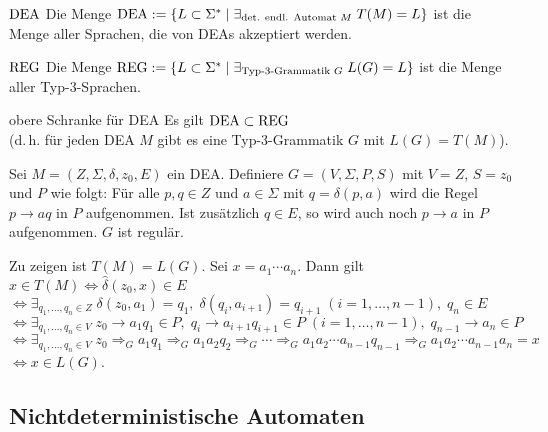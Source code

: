 \linie
\pagebreak

\begin{Def}{$\text{DEA}$}
    Die Menge $\text{DEA} := \{L \subset \Sigma^\ast \;|\;
    \exists_{\text{det. endl. Automat } M}\; T(M) = L\}$
    ist die Menge aller Sprachen, die von DEAs akzeptiert werden.
\end{Def}

\begin{Def}{$\text{REG}$}
    Die Menge $\text{REG} := \{L \subset \Sigma^\ast \;|\;
    \exists_{\text{Typ-3-Grammatik } G}\; L(G) = L\}$
    ist die Menge aller Typ-3-Sprachen.
\end{Def}

\begin{Satz}{obere Schranke für DEA}
    Es gilt $\text{DEA} \subset \text{REG}$\\
    (d.\,h. für jeden DEA $M$ gibt es eine Typ-3-Grammatik
    $G$ mit $L(G) = T(M)$).
\end{Satz}

\begin{Beweis}
    Sei $M = (Z, \Sigma, \delta, z_0, E)$ ein DEA.
    Definiere $G = (V, \Sigma, P, S)$ mit $V = Z$, $S = z_0$ und $P$ wie folgt:
    Für alle $p, q \in Z$ und $a \in \Sigma$ mit $q = \delta(p, a)$ wird
    die Regel $p \rightarrow aq$ in $P$ aufgenommen.
    Ist zusätzlich $q \in E$, so wird auch noch $p \rightarrow a$ in $P$
    aufgenommen.
    $G$ ist regulär.
    
    Zu zeigen ist $T(M) = L(G)$.
    Sei $x = a_1 \dotsb a_n$. Dann gilt
    $x \in T(M)
    \iff \widehat{\delta}(z_0, x) \in E$\\
    $\iff \exists_{q_1, \dotsc, q_n \in Z}\; \delta(z_0, a_1) = q_1,\;
    \delta(q_i, a_{i+1}) = q_{i+1}\; (i = 1, \dotsc, n - 1),\;
    q_n \in E$\\
    $\iff \exists_{q_1, \dotsc, q_n \in V}\; z_0 \rightarrow a_1 q_1 \in P,\;
    q_i \rightarrow a_{i+1} q_{i+1} \in P\; (i = 1, \dotsc, n - 1),\;
    q_{n-1} \rightarrow a_n \in P$\\
    $\iff \exists_{q_1, \dotsc, q_n \in V}\;
    z_0 \Rightarrow_G a_1 q_1 \Rightarrow_G a_1 a_2 q_2 \Rightarrow_G
    \dotsb \Rightarrow_G a_1 a_2 \dotsb a_{n-1} q_{n-1} \Rightarrow_G
    a_1 a_2 \dotsb a_{n-1} a_n = x$\\
    $\iff x \in L(G)$.
\end{Beweis}

\subsection{%
    Nichtdeterministische Automaten%
}

